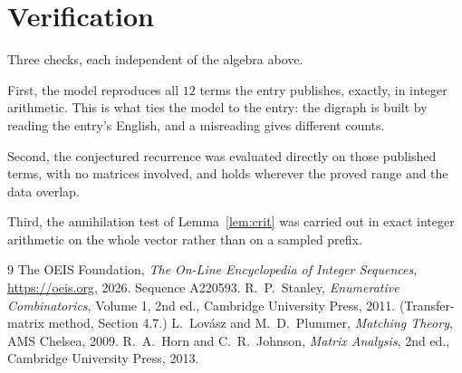 \documentclass[11pt,a4paper]{article}
\theoremstyle{plain}
\theoremstyle{definition}
\begin{document}
\section{Verification}

Three checks, each independent of the algebra above.

First, the model reproduces all $12$ terms the entry publishes, exactly, in integer
arithmetic. This is what ties the model to the entry: the digraph is built by reading the
entry's English, and a misreading gives different counts.

Second, the conjectured recurrence was evaluated directly on those published terms, with no
matrices involved, and holds wherever the proved range and the data overlap.

Third, the annihilation test of Lemma~\ref{lem:crit} was carried out in exact integer
arithmetic on the whole vector rather than on a sampled prefix.

\begin{thebibliography}{9}
 The OEIS Foundation, \emph{The On-Line Encyclopedia of Integer
Sequences}, \url{https://oeis.org}, 2026. Sequence A220593.
 R.~P.~Stanley, \emph{Enumerative Combinatorics}, Volume 1, 2nd ed.,
Cambridge University Press, 2011. (Transfer-matrix method, Section 4.7.)
 L.~Lov\'asz and M.~D.~Plummer, \emph{Matching Theory}, AMS Chelsea,
2009.
 R.~A.~Horn and C.~R.~Johnson, \emph{Matrix Analysis}, 2nd ed., Cambridge
University Press, 2013.
\end{thebibliography}
\end{document}
